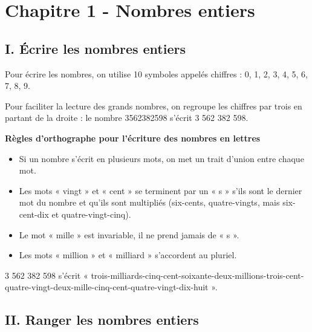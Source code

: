 

\section*{Chapitre 1 - Nombres entiers}


\subsection*{I. Écrire les nombres entiers}

\begin{Définition*}
Pour écrire les nombres, on utilise 10 symboles appelés chiffres : 0, 1, 2, 3, 4, 5, 6, 7, 8, 9.
\end{Définition*}


\begin{Remarque}
Pour faciliter la lecture des grands nombres, on regroupe les chiffres par trois en partant de la droite : 
le nombre 3562382598 s'écrit 3 562 382 598.
\end{Remarque}


\textbf{Règles d'orthographe pour l'écriture des nombres en lettres}

\begin{itemize}
\item Si un nombre s'écrit en plusieurs mots, on met un trait d'union entre chaque mot.
\item Les mots « vingt » et « cent » se terminent par un « s » s'ils sont le dernier mot du nombre et qu'ils sont multipliés (six-cents, quatre-vingts, mais six-cent-dix et quatre-vingt-cinq).
\item Le mot « mille » est invariable, il ne prend jamais de « s ».
\item Les mots « million » et « milliard » s'accordent au pluriel.
\end{itemize}



\begin{Exemple}
3 562 382 598 s'écrit « trois-milliards-cinq-cent-soixante-deux-millions-trois-cent-quatre-vingt-deux-mille-cinq-cent-quatre-vingt-dix-huit ».
\end{Exemple}


\subsection*{II. Ranger les nombres entiers}



